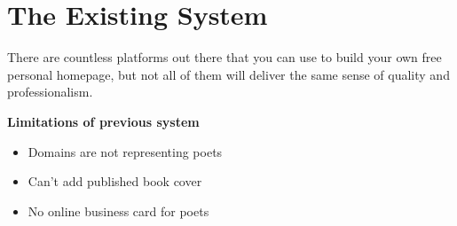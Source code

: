 \section{The Existing System}
There are countless platforms out there that you can use to build your own free personal homepage, but not all of them will deliver the same sense of quality and professionalism.


{\bf {Limitations of previous system }}
\begin{itemize}
\item Domains are not representing poets
\item Can’t add published book cover
\item No online business card for poets
\end{itemize}
